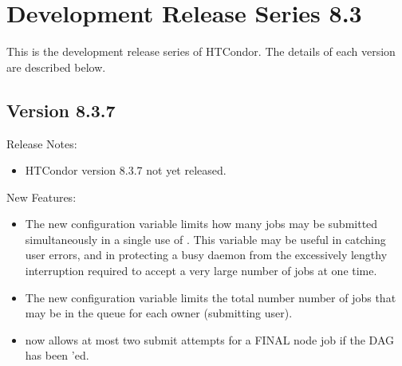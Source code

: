 
\section{\label{sec:History-8-3}Development Release Series 8.3}

This is the development release series of HTCondor.
The details of each version are described below.

\subsection*{\label{sec:New-8-3-7}Version 8.3.7}

\noindent Release Notes:

\begin{itemize}

\item HTCondor version 8.3.7 not yet released.

\end{itemize}


\noindent New Features:

\begin{itemize}

\item The new configuration variable 
limits how many jobs may be submitted simultaneously in a single
use of .  This variable may be useful in catching user errors,
and in protecting a busy  daemon
from the excessively lengthy interruption
required to accept a very large number of jobs at one time.

\item The new configuration variable 
limits the total number number of jobs that may be in the queue for each
owner (submitting user).

\item {} now allows at most two submit attempts for a FINAL
node job if the DAG has been 'ed.

\end{itemize}

